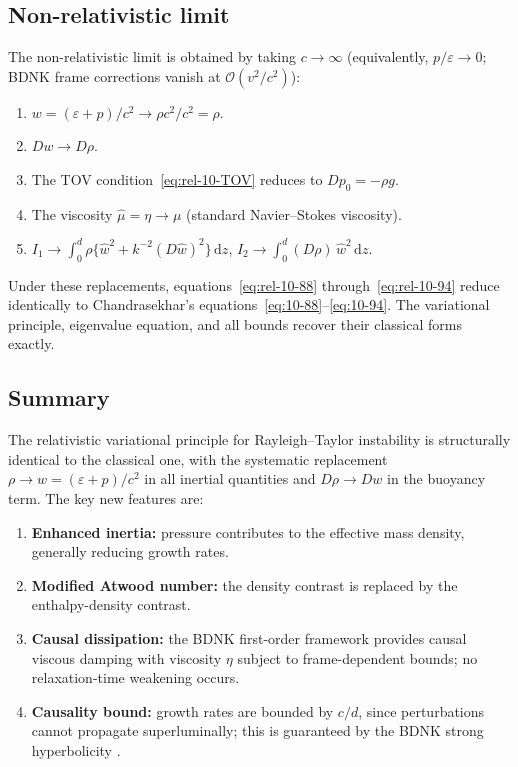 \subsection{Non-relativistic limit}\label{ssec:rel-10-NR}

The non-relativistic limit is obtained by taking $c \to \infty$
(equivalently, $p/\varepsilon \to 0$; BDNK frame corrections
vanish at $\mathcal{O}(v^2/c^2)$):
\begin{enumerate}
\item $w = (\varepsilon + p)/c^{2} \to \rho c^{2}/c^{2} = \rho$.
\item $Dw \to D\rho$.
\item The TOV condition~\eqref{eq:rel-10-TOV} reduces to $Dp_{0} =
  -\rho g$.
\item The viscosity $\hat{\mu} = \eta
  \to \mu$ (standard Navier--Stokes viscosity).
\item $I_{1} \to \int_{0}^{d}\rho\bigl\{\hat{w}^{2} +
  k^{-2}(D\hat{w})^{2}\bigr\}\,\mathrm{d}z$, $I_{2} \to
  \int_{0}^{d}(D\rho)\,\hat{w}^{2}\,\mathrm{d}z$.
\end{enumerate}
Under these replacements, equations~\eqref{eq:rel-10-88}
through~\eqref{eq:rel-10-94} reduce identically to
Chandrasekhar's equations~\eqref{eq:10-88}--\eqref{eq:10-94}.
The variational principle, eigenvalue equation, and all bounds
recover their classical forms exactly.

\subsection{Summary}

The relativistic variational principle for Rayleigh--Taylor
instability is structurally identical to the classical one, with the
systematic replacement $\rho \to w = (\varepsilon + p)/c^{2}$ in all
inertial quantities and $D\rho \to Dw$ in the buoyancy term.  The
key new features are:
\begin{enumerate}
\item \textbf{Enhanced inertia:} pressure contributes to the effective
  mass density, generally reducing growth rates.
\item \textbf{Modified Atwood number:} the density contrast is
  replaced by the enthalpy-density contrast.
\item \textbf{Causal dissipation:} the BDNK first-order framework
  provides causal viscous damping with viscosity $\eta$ subject to
  frame-dependent bounds; no relaxation-time weakening occurs.
\item \textbf{Causality bound:} growth rates are bounded by $c/d$,
  since perturbations cannot propagate superluminally; this is
  guaranteed by the BDNK strong hyperbolicity
  \citep{BemficaDN2018,Kovtun2019}.
\end{enumerate}

